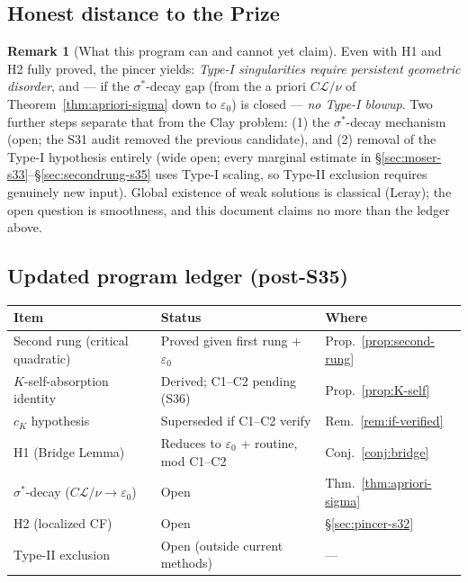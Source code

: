 \documentclass[11pt]{article}
\theoremstyle{definition}
\newtheorem{remark}[theorem]{Remark}
\theoremstyle{remark}
\begin{document}
\subsection{Honest distance to the Prize}

\begin{remark}[What this program can and cannot yet claim]
  Even with H1 and H2 fully proved, the pincer yields: \emph{Type-I
  singularities require persistent geometric disorder}, and --- if the
  $\sigma^*$-decay gap (from the a priori $C\mathcal{L}/\nu$ of
  Theorem~\ref{thm:apriori-sigma} down to $\varepsilon_0$) is closed ---
  \emph{no Type-I blowup}. Two further steps separate that from the Clay
  problem: (1) the $\sigma^*$-decay mechanism (open; the S31 audit removed
  the previous candidate), and (2) removal of the Type-I hypothesis
  entirely (wide open; every marginal estimate in
  \S\ref{sec:moser-s33}--\S\ref{sec:secondrung-s35} uses Type-I scaling,
  so Type-II exclusion requires genuinely new input). Global existence of
  weak solutions is classical (Leray); the open question is smoothness,
  and this document claims no more than the ledger above.
\end{remark}

\subsection{Updated program ledger (post-S35)}

\begin{center}
\begin{tabular}{lll}
\hline
Item & Status & Where \\
\hline
Second rung (critical quadratic) & Proved given first rung + $\varepsilon_0$ & Prop.~\ref{prop:second-rung} \\
$K$-self-absorption identity & Derived; C1--C2 pending (S36) & Prop.~\ref{prop:K-self} \\
$c_K$ hypothesis & Superseded if C1--C2 verify & Rem.~\ref{rem:if-verified} \\
H1 (Bridge Lemma) & Reduces to $\varepsilon_0$ + routine, mod C1--C2 & Conj.~\ref{conj:bridge} \\
$\sigma^*$-decay ($C\mathcal{L}/\nu \to \varepsilon_0$) & Open & Thm.~\ref{thm:apriori-sigma} \\
H2 (localized CF) & Open & \S\ref{sec:pincer-s32} \\
Type-II exclusion & Open (outside current methods) & --- \\
\hline
\end{tabular}
\end{center}
\end{document}
